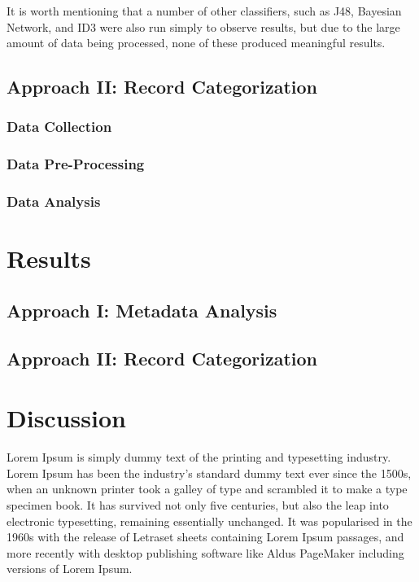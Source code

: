 \documentclass[11pt, notitlepage,abstracton,oneside]{article}   	%
\begin{document}
It is worth mentioning that a number of other classifiers, such as J48, Bayesian Network, and ID3 were also run simply to observe results, but due to the large amount of data being processed, none of these produced meaningful results. 

\subsection{Approach II: Record Categorization}
\subsubsection{Data Collection}

\subsubsection{Data Pre-Processing}

\subsubsection{Data Analysis}

\section{Results}

\subsection{Approach I: Metadata Analysis}

\subsection{Approach II: Record Categorization}

\section{Discussion}
Lorem Ipsum is simply dummy text of the printing and typesetting industry. Lorem Ipsum has been the industry's standard dummy text ever since the 1500s, when an unknown printer took a galley of type and scrambled it to make a type specimen book. It has survived not only five centuries, but also the leap into electronic typesetting, remaining essentially unchanged. It was popularised in the 1960s with the release of Letraset sheets containing Lorem Ipsum passages, and more recently with desktop publishing software like Aldus PageMaker including versions of Lorem Ipsum.
\end{document}
